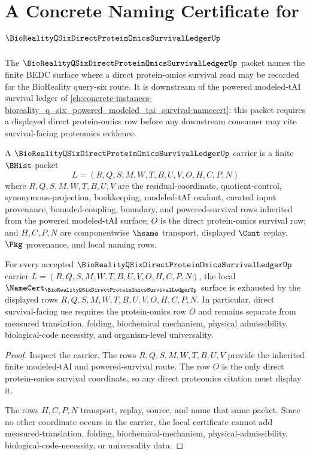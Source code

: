 \chapter{A Concrete Naming Certificate for $\BioRealityQSixDirectProteinOmicsSurvivalLedgerUp$}
\label{ch:concrete-instances-bioreality_q_six_direct_protein_omics_survival-namecert}

The $\BioRealityQSixDirectProteinOmicsSurvivalLedgerUp$ packet names the finite BEDC surface where a direct protein-omics survival read may be recorded for the BioReality query-six route. It is downstream of the powered modeled-tAI survival ledger of \autoref{ch:concrete-instances-bioreality_q_six_powered_modeled_tai_survival-namecert}: this packet requires a displayed direct protein-omics row before any downstream consumer may cite survival-facing proteomics evidence.

\begin{definition}
\label{def:bioreality-q-six-direct-protein-omics-survival-ledger-carrier}
A $\BioRealityQSixDirectProteinOmicsSurvivalLedgerUp$ carrier is a finite $\BHist$ packet
$$
L=(R,Q,S,M,W,T,B,U,V,O,H,C,P,N)
$$
where $R,Q,S,M,W,T,B,U,V$ are the residual-coordinate, quotient-control, synonymous-projection, bookkeeping, modeled-tAI readout, curated input provenance, bounded-coupling, boundary, and powered-survival rows inherited from the powered modeled-tAI surface; $O$ is the direct protein-omics survival row; and $H,C,P,N$ are componentwise $\hsame$ transport, displayed $\Cont$ replay, $\Pkg$ provenance, and local naming rows.
\end{definition}

\begin{theorem}
\label{thm:bioreality-q-six-direct-protein-omics-survival-ledger-namecert-obligations}
For every accepted $\BioRealityQSixDirectProteinOmicsSurvivalLedgerUp$ carrier $L=(R,Q,S,M,W,T,B,U,V,O,H,C,P,N)$, the local $\NameCert_{\BioRealityQSixDirectProteinOmicsSurvivalLedgerUp}$ surface is exhausted by the displayed rows $R,Q,S,M,W,T,B,U,V,O,H,C,P,N$. In particular, direct survival-facing use requires the protein-omics row $O$ and remains separate from measured translation, folding, biochemical mechanism, physical admissibility, biological-code necessity, and organism-level universality.
\end{theorem}

\begin{proof}
Inspect the carrier. The rows $R,Q,S,M,W,T,B,U,V$ provide the inherited finite modeled-tAI and powered-survival route. The row $O$ is the only direct protein-omics survival coordinate, so any direct proteomics citation must display it.

The rows $H,C,P,N$ transport, replay, source, and name that same packet. Since no other coordinate occurs in the carrier, the local certificate cannot add measured-translation, folding, biochemical-mechanism, physical-admissibility, biological-code-necessity, or universality data.
\end{proof}


